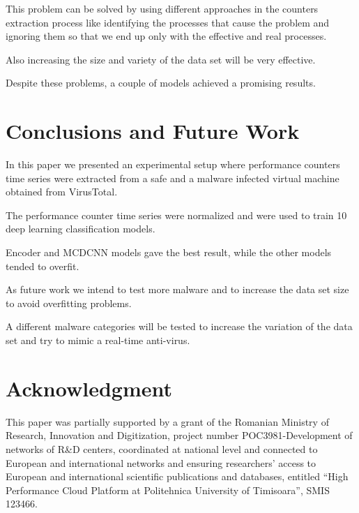 \documentclass[conference]{IEEEtran}
\begin{document}
This problem can be solved by using different approaches in the counters extraction process like identifying the processes that cause the problem and ignoring them so that we end up only with the effective and real processes. 

Also increasing the size and variety of the data set will be very effective. 

Despite these problems, a couple of models achieved a promising results.

\section{Conclusions and Future Work}
\label{sec:conclusions-and-future-work}
In this paper we presented an experimental setup where performance counters time series were 
extracted from a safe and a malware infected virtual machine obtained from VirusTotal.

The performance counter time series were normalized and were used to train 10 deep learning classification models.

Encoder and MCDCNN models gave the best result, while the other models tended to overfit.

As future work we intend to test more malware and to increase the data set size to avoid overfitting problems.

A different malware categories will be tested to increase the variation of the data set and try to mimic a real-time anti-virus.

\section*{Acknowledgment} 
This paper was partially supported by a grant of the Romanian Ministry of Research, Innovation and Digitization, 
project number POC\/398\/1-Development of networks of R\&D centers, 
coordinated at national level and connected to European and international networks and 
ensuring researchers’ access to European and international scientific publications and databases, 
entitled “High Performance Cloud Platform at Politehnica University of Timisoara”, SMIS 123466.


\balance

\end{document}
